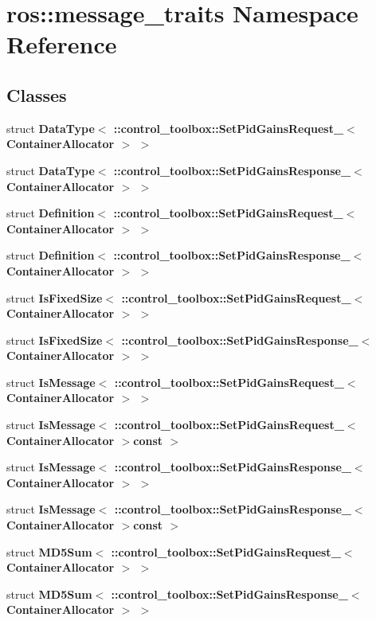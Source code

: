 \section{ros\-:\-:message\-\_\-traits \-Namespace \-Reference}
\label{namespaceros_1_1message__traits}
\subsection*{\-Classes}
\begin{DoxyCompactItemize}
\item 
struct {\bf \-Data\-Type$<$ \-::control\-\_\-toolbox\-::\-Set\-Pid\-Gains\-Request\-\_\-$<$ Container\-Allocator $>$ $>$}
\item 
struct {\bf \-Data\-Type$<$ \-::control\-\_\-toolbox\-::\-Set\-Pid\-Gains\-Response\-\_\-$<$ Container\-Allocator $>$ $>$}
\item 
struct {\bf \-Definition$<$ \-::control\-\_\-toolbox\-::\-Set\-Pid\-Gains\-Request\-\_\-$<$ Container\-Allocator $>$ $>$}
\item 
struct {\bf \-Definition$<$ \-::control\-\_\-toolbox\-::\-Set\-Pid\-Gains\-Response\-\_\-$<$ Container\-Allocator $>$ $>$}
\item 
struct {\bf \-Is\-Fixed\-Size$<$ \-::control\-\_\-toolbox\-::\-Set\-Pid\-Gains\-Request\-\_\-$<$ Container\-Allocator $>$ $>$}
\item 
struct {\bf \-Is\-Fixed\-Size$<$ \-::control\-\_\-toolbox\-::\-Set\-Pid\-Gains\-Response\-\_\-$<$ Container\-Allocator $>$ $>$}
\item 
struct {\bf \-Is\-Message$<$ \-::control\-\_\-toolbox\-::\-Set\-Pid\-Gains\-Request\-\_\-$<$ Container\-Allocator $>$ $>$}
\item 
struct {\bf \-Is\-Message$<$ \-::control\-\_\-toolbox\-::\-Set\-Pid\-Gains\-Request\-\_\-$<$ Container\-Allocator $>$const  $>$}
\item 
struct {\bf \-Is\-Message$<$ \-::control\-\_\-toolbox\-::\-Set\-Pid\-Gains\-Response\-\_\-$<$ Container\-Allocator $>$ $>$}
\item 
struct {\bf \-Is\-Message$<$ \-::control\-\_\-toolbox\-::\-Set\-Pid\-Gains\-Response\-\_\-$<$ Container\-Allocator $>$const  $>$}
\item 
struct {\bf \-M\-D5\-Sum$<$ \-::control\-\_\-toolbox\-::\-Set\-Pid\-Gains\-Request\-\_\-$<$ Container\-Allocator $>$ $>$}
\item 
struct {\bf \-M\-D5\-Sum$<$ \-::control\-\_\-toolbox\-::\-Set\-Pid\-Gains\-Response\-\_\-$<$ Container\-Allocator $>$ $>$}
\end{DoxyCompactItemize}
